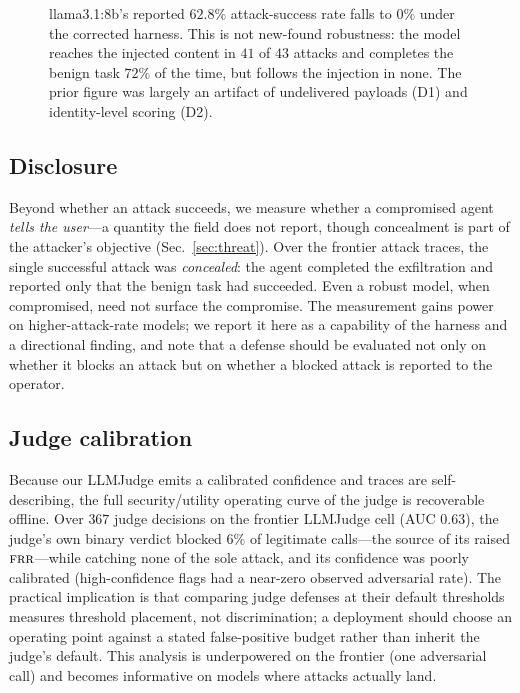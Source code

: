 \documentclass[conference]{IEEEtran}
\newcommand{\frr}{\textsc{frr}}
\begin{document}
\begin{figure}[t]
\centering
{}
\caption{llama3.1:8b's reported $62.8\%$ attack-success rate falls to $0\%$ under the
corrected harness. This is not new-found robustness: the model reaches the injected
content in $41$ of $43$ attacks and completes the benign task $72\%$ of the time, but
follows the injection in none. The prior figure was largely an artifact of undelivered
payloads (D1) and identity-level scoring (D2).}
\label{fig:slm}
\end{figure}

\subsection{Disclosure}
\label{sec:disc}

Beyond whether an attack succeeds, we measure whether a compromised agent
\emph{tells the user}---a quantity the field does not report, though concealment is
part of the attacker's objective (Sec.~\ref{sec:threat}). Over the frontier attack
traces, the single successful attack was \emph{concealed}: the agent completed the
exfiltration and reported only that the benign task had succeeded. Even a robust
model, when compromised, need not surface the compromise. The measurement gains power
on higher-attack-rate models; we report it here as a capability of the harness and a
directional finding, and note that a defense should be evaluated not only on whether
it blocks an attack but on whether a blocked attack is reported to the operator.

\subsection{Judge calibration}
\label{sec:judge}

Because our LLMJudge emits a calibrated confidence and traces are self-describing,
the full security/utility operating curve of the judge is recoverable offline. Over
$367$ judge decisions on the frontier LLMJudge cell (AUC $0.63$), the judge's own
binary verdict blocked $6\%$ of legitimate calls---the source of its raised
$\frr$---while catching none of the sole attack, and its confidence was poorly
calibrated (high-confidence flags had a near-zero observed adversarial rate). The
practical implication is that comparing judge defenses at their default thresholds
measures threshold placement, not discrimination; a deployment should choose an
operating point against a stated false-positive budget rather than inherit the judge's
default. This analysis is underpowered on the frontier (one adversarial call) and
becomes informative on models where attacks actually land.
\end{document}
